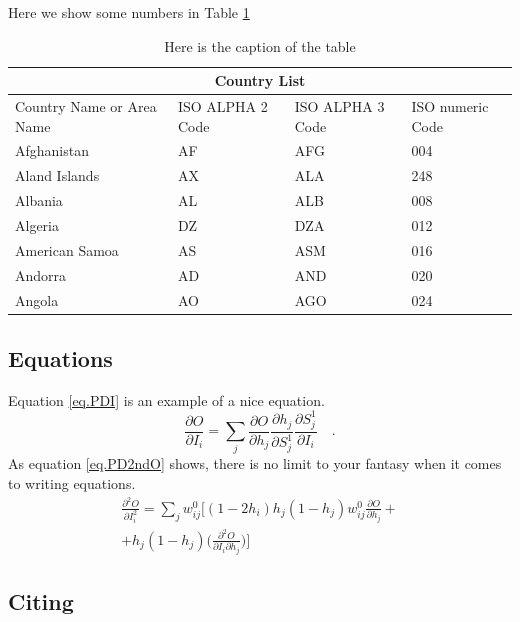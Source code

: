 \documentclass[12pt,oneside,a4paper]{article}
\begin{document}
Here we show some numbers in Table \ref{tab.someTable}


\begin{table}
\begin{center}
\begin{tabular}{|p{3cm}|p{3cm}|p{3cm}|p{3cm}|}
\hline
\multicolumn{4}{|c|}{Country List} \\
\hline
Country Name     or Area Name& ISO ALPHA 2 Code &ISO ALPHA 3 Code&ISO numeric Code\\
\hline
Afghanistan   & AF    &AFG&   004\\
Aland Islands&   AX  & ALA   &248\\
Albania &AL & ALB&  008\\
Algeria    &DZ & DZA&  012\\
American Samoa&   AS  & ASM&016\\
Andorra& AD  & AND   &020\\
Angola& AO  & AGO&024\\
\hline
\end{tabular}
\label{tab.someTable}
\caption{Here is the caption of the table}\vspace{8pt}
\end{center}
\end{table}

\subsection{Equations}

Equation \ref{eq.PDI} is an example of a nice equation.
\begin{equation}
\frac{\partial O}{\partial I_{i}} = \sum_{j}{\frac{\partial O}{\partial h_{j}}\frac{\partial h_{j}}{\partial S_{j}^{1}}\frac{\partial S_{j}^{1}}{\partial I_{i}}}\quad.
\label{eq.PDI}
\end{equation}
As equation \ref{eq.PD2ndO} shows, there is no limit to your fantasy when it comes to writing equations.
\begin{eqnarray}
\nonumber\frac{\partial^{2} O}{\partial I_{i}^{2}} =
\sum_{j}w_{ij}^{0}\Bigg [ (1 - 2h_{i})h_{j}(1 - h_{j})w_{ij}^{0}\frac{\partial O}{\partial h_{j}} +\\
+ h_{j}(1 - h_{j})\Bigg(\frac{\partial^{2} O}{\partial I_{i} \partial h_{j}}\Bigg)
\Bigg ]\label{eq.PD2ndO}
\end{eqnarray}

\subsection{Citing}
\end{document}
